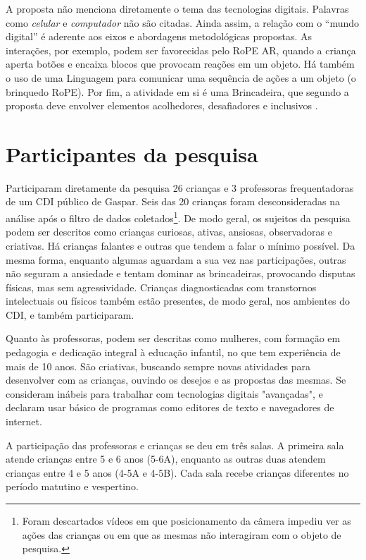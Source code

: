 A proposta não menciona diretamente o tema das tecnologias digitais. Palavras como \textit{celular} e \textit{computador} não são citadas. Ainda assim, a relação com o “mundo digital” é aderente aos eixos e abordagens metodológicas propostas. As interações, por exemplo, podem ser favorecidas pelo RoPE AR, quando a criança aperta botões e encaixa blocos que provocam reações em um objeto. Há também o uso de uma Linguagem para comunicar uma sequência de ações a um objeto (o brinquedo RoPE). Por fim, a atividade em si é uma Brincadeira, que segundo a proposta deve envolver elementos acolhedores, desafiadores e inclusivos \cite[p.50]{gaspar_proposta_2010}.




\section{Participantes da pesquisa}
\label{sec:participantes}

Participaram diretamente da pesquisa 26 crianças e 3 professoras frequentadoras de um CDI público de Gaspar. Seis das 20 crianças foram desconsideradas na análise após o filtro de dados coletados\footnote{Foram descartados vídeos em que posicionamento da câmera impediu ver as ações das crianças ou em que as mesmas não interagiram com o objeto de pesquisa.}. De modo geral, os sujeitos da pesquisa podem ser descritos como crianças curiosas, ativas, ansiosas, observadoras e criativas. Há crianças falantes e outras que tendem a falar o mínimo possível. Da mesma forma, enquanto algumas aguardam a sua vez nas participações, outras não seguram a ansiedade e tentam dominar as brincadeiras, provocando disputas físicas, mas sem agressividade. Crianças diagnosticadas com transtornos intelectuais ou físicos também estão presentes, de modo geral, nos ambientes do CDI, e também participaram.

Quanto às professoras, podem ser descritas como mulheres, com formação em pedagogia e dedicação integral à educação infantil, no que tem experiência de mais de 10 anos. São criativas, buscando sempre novas atividades para desenvolver com as crianças, ouvindo os desejos e as propostas das mesmas. Se consideram inábeis para trabalhar com tecnologias digitais "avançadas", e declaram usar básico de programas como editores de texto e navegadores de internet.

A participação das professoras e crianças se deu em três salas. A primeira sala atende crianças entre 5 e 6 anos (5-6A), enquanto as outras duas atendem crianças entre 4 e 5 anos (4-5A e 4-5B). Cada sala recebe crianças diferentes no período matutino e vespertino.

